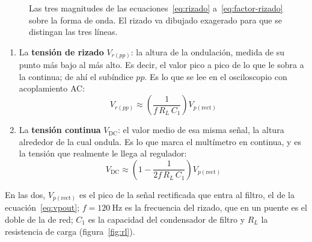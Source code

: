\documentclass[11pt,a4paper]{article}
\begin{document}
\begin{figure}[H]
  \caption[Las tres magnitudes del filtro]{Las tres magnitudes de las
  ecuaciones~\eqref{eq:rizado} a~\eqref{eq:factor-rizado} sobre la forma de onda. El rizado
  va dibujado exagerado para que se distingan las tres líneas.}
  \label{fig:rizado-partes}
\end{figure}

\begin{enumerate}[label=\textbf{\alph*)}, leftmargin=*, labelsep=0.6em]
\item La \textbf{tensión de rizado} $V_{r(pp)}$: la altura de la ondulación, medida de su
punto más bajo al más alto. Es decir, el valor pico a pico de lo que le sobra a la
continua; de ahí el subíndice $pp$. Es lo que se lee en el osciloscopio con acoplamiento
AC:
\begin{equation}
  V_{r(pp)}\approx\left(\frac{1}{f\,R_L\,C_1}\right)V_{p(\text{rect})}
  \label{eq:rizado}
\end{equation}

\item La \textbf{tensión continua} $V_{\text{DC}}$: el valor medio de esa misma señal, la
altura alrededor de la cual ondula. Es lo que marca el multímetro en continua, y es la
tensión que realmente le llega al regulador:
\begin{equation}
  V_{\text{DC}}\approx\left(1-\frac{1}{2f\,R_L\,C_1}\right)V_{p(\text{rect})}
  \label{eq:vdc}
\end{equation}
\end{enumerate}

En las dos, $V_{p(\text{rect})}$ es el pico de la señal rectificada que entra al filtro, el
de la ecuación~\eqref{eq:vpout}; $f=\qty{120}{\hertz}$ es la frecuencia del rizado, que en
un puente es el doble de la de red; $C_1$ es la capacidad del condensador de filtro y $R_L$
la resistencia de carga (figura~\ref{fig:rl}).
\end{document}
